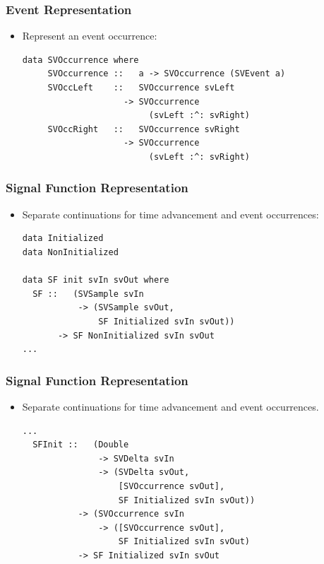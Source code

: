 \documentclass{beamer}
\begin{document}
\begin{frame}[fragile]
\frametitle{Event Representation}
    \begin{itemize} 
        \item Represent an event occurrence:
\begin{Verbatim}
data SVOccurrence where
     SVOccurrence ::   a -> SVOccurrence (SVEvent a)
     SVOccLeft    ::   SVOccurrence svLeft
                    -> SVOccurrence
                         (svLeft :^: svRight)
     SVOccRight   ::   SVOccurrence svRight
                    -> SVOccurrence
                         (svLeft :^: svRight)
\end{Verbatim}
    \end{itemize}
\end{frame}

\begin{frame}[fragile]
\frametitle{Signal Function Representation}
    \begin{itemize}
        \item Separate continuations for time advancement and event occurrences:
\begin{Verbatim}
data Initialized
data NonInitialized

data SF init svIn svOut where
  SF ::   (SVSample svIn
           -> (SVSample svOut,
               SF Initialized svIn svOut))
       -> SF NonInitialized svIn svOut
...
\end{Verbatim}
    \end{itemize}
\end{frame}

\begin{frame}[fragile]
\frametitle{Signal Function Representation}
    \begin{itemize}
    \item Separate continuations for time advancement and event occurrences.
\begin{Verbatim}
...
  SFInit ::   (Double 
               -> SVDelta svIn
               -> (SVDelta svOut,
                   [SVOccurrence svOut],
                   SF Initialized svIn svOut))
           -> (SVOccurrence svIn
               -> ([SVOccurrence svOut],
                   SF Initialized svIn svOut)
           -> SF Initialized svIn svOut
\end{Verbatim}
    \end{itemize}
\end{frame}
\end{document}
